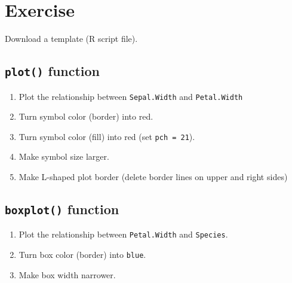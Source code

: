 \documentclass[
]{book}
\providecommand{\tightlist}{%
  \setlength{\itemsep}{0pt}\setlength{\parskip}{0pt}}
\begin{document}
\hypertarget{exercise-1}{%
\section{Exercise}\label{exercise-1}}

Download a template (R script file).

\hypertarget{plot-function}{%
\subsection{\texorpdfstring{\texttt{plot()} function}{plot() function}}\label{plot-function}}

\begin{enumerate}
\def\labelenumi{\alph{enumi}.}
\tightlist
\item
  Plot the relationship between \texttt{Sepal.Width} and \texttt{Petal.Width}
\item
  Turn symbol color (border) into red.
\item
  Turn symbol color (fill) into red (set \texttt{pch\ =\ 21}).
\item
  Make symbol size larger.
\item
  Make L-shaped plot border (delete border lines on upper and right sides)
\end{enumerate}

\hypertarget{boxplot-function}{%
\subsection{\texorpdfstring{\texttt{boxplot()} function}{boxplot() function}}\label{boxplot-function}}

\begin{enumerate}
\def\labelenumi{\alph{enumi}.}
\tightlist
\item
  Plot the relationship between \texttt{Petal.Width} and \texttt{Species}.
\item
  Turn box color (border) into \texttt{blue}.
\item
  Make box width narrower.
\end{enumerate}

  
\end{document}
